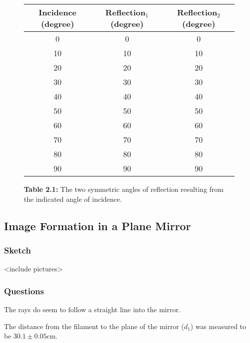\documentclass[12pt]{article}
\begin{document}
\begin{figure}[H]
  \label{tab:2.1}
  \begin{center}
    \begin{tabular}{|c|c|c|}
      \hline
      Incidence (\si{degree}) & Reflection\(_1\) (\si{degree}) & Reflection\(_2\)
                                                             (\si{degree}) \\
      \hline
      0 & 0 & 0 \\
      10 & 10 & 10 \\
      20 & 20 & 20 \\
      30 & 30 & 30 \\
      40 & 40 & 40 \\
      50 & 50 & 50 \\
      60 & 60 & 60 \\
      70 & 70 & 70 \\
      80 & 80 & 80 \\
      90 & 90 & 90 \\
      \hline
    \end{tabular}
  \end{center}
  \caption{\textbf{Table 2.1:} The two symmetric angles of reflection resulting
    from the indicated angle of incidence.}
\end{figure}
 


\subsection{Image Formation in a Plane Mirror}

\subsubsection{Sketch}

<include pictures>

\subsubsection{Questions}

\subsubsubsection{}

The rays do seem to follow a straight line into the mirror.

\subsubsubsection{}

The distance from the filament to the plane of the mirror (\(d_1\)) was measured
to be \(30.1 \pm 0.05 \si{\centi\meter}\).
\end{document}
